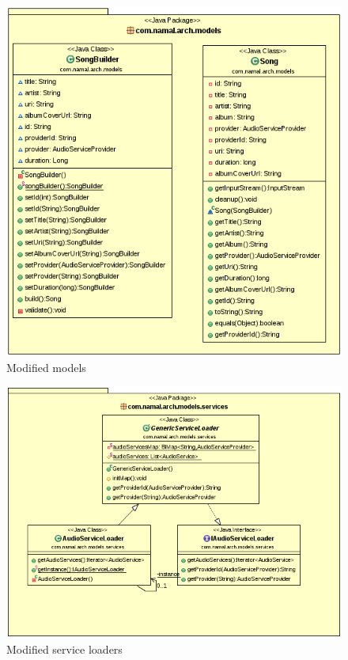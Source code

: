 \documentclass{report}
\begin{document}
{{\begin{figure}[H]
  \includegraphics[scale=0.4]{class/update-2-1.png}
  \caption{Modified models}
  \label{modmod}
\end{figure}

\begin{figure}[H]

  \includegraphics[scale=0.4]{class/update-2-2.png}
  \caption{Modified service loaders}
  \label{modSL}
\end{figure}
}

}
\end{document}
